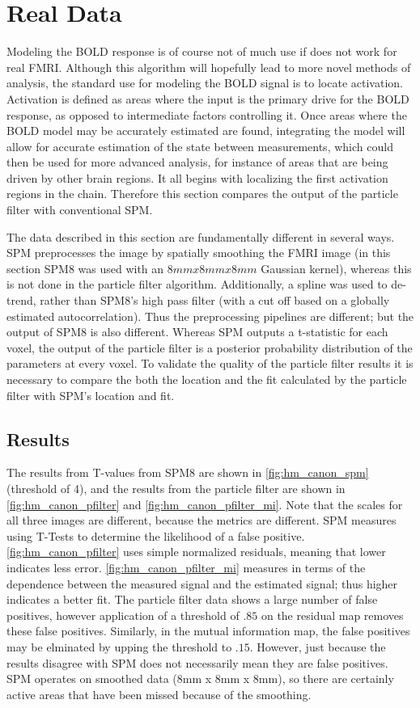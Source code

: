 \chapter{Real Data}
\label{sec:RealData}
Modeling the BOLD response is of course not of much use if does not work for
real FMRI.  Although this algorithm will hopefully lead to more novel methods 
of analysis, the standard use for modeling the BOLD signal is to locate activation.
Activation is defined as areas where the input is the primary drive
for the BOLD response, as opposed to intermediate factors controlling it. 
Once areas where the BOLD 
model may be accurately estimated are found, integrating the model will allow for accurate
estimation of the state between measurements, which could then be used for more 
advanced analysis, for instance of areas that are being driven by other brain regions.
It all begins with localizing the first activation regions in the
chain. Therefore this section compares the output of the particle filter 
with conventional SPM. 

The data described in this section are fundamentally different in several 
ways. SPM preprocesses the image by spatially smoothing the FMRI image (in this section 
SPM8 was used with an $8mm x 8mm x 8mm$ Gaussian kernel), whereas
this is not done in the particle filter algorithm. Additionally, a spline
was used to de-trend, rather than SPM8's high pass filter (with a cut
off based on a globally estimated autocorrelation). Thus the preprocessing pipelines 
are different; but the output of SPM8 is also different. Whereas SPM outputs
a t-statistic for each voxel, the output 
of the particle filter is a posterior probability distribution of the parameters
at every voxel. To validate the quality of the particle filter results 
it is necessary to compare the both the location and the fit calculated by the particle filter
with SPM's location and fit.

\section{Results}
The results from T-values from SPM8 are shown in \autoref{fig:hm_canon_spm} (threshold of
4), and the results from 
the particle filter are shown in \autoref{fig:hm_canon_pfilter} and \autoref{fig:hm_canon_pfilter_mi}.
Note that the scales for all three images are different, because the metrics are different.
SPM measures using T-Tests to determine the likelihood of a false positive. \autoref{fig:hm_canon_pfilter}
uses simple normalized residuals, meaning that lower indicates less error.  
\autoref{fig:hm_canon_pfilter_mi} measures in terms of the dependence between the 
measured signal and the estimated signal; thus higher indicates a better fit. The particle
filter data shows a large number of false positives, however application of a threshold
of $.85$ on the residual map removes these false positives. Similarly, in the mutual information
map, the false positives may be elminated by upping the threshold to $.15$. However, just
because the results disagree with SPM does not necessarily mean they are false positives.
SPM operates on smoothed data (8mm x 8mm x 8mm), so there are certainly active 
areas that have been missed because of the smoothing. 

